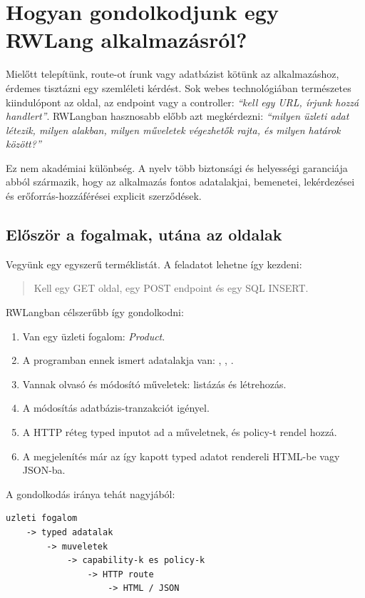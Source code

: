 \chapter{Hogyan gondolkodjunk egy RWLang alkalmazásról?}

Mielőtt telepítünk, route-ot írunk vagy adatbázist kötünk az alkalmazáshoz, érdemes tisztázni egy szemléleti kérdést. Sok webes technológiában természetes kiindulópont az oldal, az endpoint vagy a controller: \emph{``kell egy  URL, írjunk hozzá handlert''}. RWLangban hasznosabb előbb azt megkérdezni: \emph{``milyen üzleti adat létezik, milyen alakban, milyen műveletek végezhetők rajta, és milyen határok között?''}

Ez nem akadémiai különbség. A nyelv több biztonsági és helyességi garanciája abból származik, hogy az alkalmazás fontos adatalakjai, bemenetei, lekérdezései és erőforrás-hozzáférései explicit szerződések.

\section{Először a fogalmak, utána az oldalak}

Vegyünk egy egyszerű terméklistát. A feladatot lehetne így kezdeni:

\begin{quote}
Kell egy GET oldal, egy POST endpoint és egy SQL INSERT.
\end{quote}

RWLangban célszerűbb így gondolkodni:

\begin{enumerate}
  \item Van egy üzleti fogalom: \emph{Product}.
  \item A programban ennek ismert adatalakja van: , , .
  \item Vannak olvasó és módosító műveletek: listázás és létrehozás.
  \item A módosítás adatbázis-tranzakciót igényel.
  \item A HTTP réteg typed inputot ad a műveletnek, és policy-t rendel hozzá.
  \item A megjelenítés már az így kapott typed adatot rendereli HTML-be vagy JSON-ba.
\end{enumerate}

A gondolkodás iránya tehát nagyjából:

\begin{lstlisting}
uzleti fogalom
    -> typed adatalak
        -> muveletek
            -> capability-k es policy-k
                -> HTTP route
                    -> HTML / JSON
\end{lstlisting}

